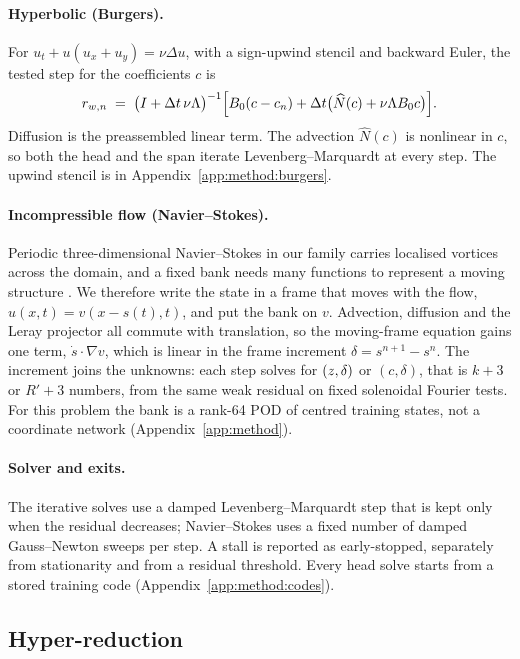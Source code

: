 \documentclass{article}
\begin{document}
\paragraph{Hyperbolic (Burgers).}
For $u_t+u(u_x+u_y)=\nu\Delta u$, with a sign-upwind stencil and backward
Euler, the tested step for the coefficients $c$ is
\begin{equation}
  r_{w,n}
  \;=\;
  \big(I+\Delta t\,\nu\Lambda\big)^{-1}
  \Big[
    B_0(c-c_n)
    +\Delta t\big(\widehat N(c)+\nu\Lambda B_0 c\big)
  \Big].
  \label{eq:burgers-step}
\end{equation}
Diffusion is the preassembled linear term. The advection $\widehat N(c)$ is
nonlinear in $c$, so both the head and the span iterate
Levenberg--Marquardt at every step. The upwind stencil is in
Appendix~\ref{app:method:burgers}.

\paragraph{Incompressible flow (Navier--Stokes).}
Periodic three-dimensional Navier--Stokes in our family carries localised
vortices across the domain, and a fixed bank needs many functions to
represent a moving structure \citep{CohenDeVore2015}. We therefore write
the state in a frame that moves with the flow,
$u(x,t)=v(x-s(t),t)$, and put the bank on $v$. Advection, diffusion and
the Leray projector all commute with translation, so the moving-frame
equation gains one term, $\dot s\cdot\nabla v$, which is linear in the
frame increment $\delta=s^{n+1}-s^{n}$. The increment joins the unknowns:
each step solves for $(z,\delta)$ or $(c,\delta)$, that is $k+3$ or
$R'+3$ numbers, from the same weak residual on fixed solenoidal Fourier
tests. For this problem the bank is a rank-64 POD of centred training
states, not a coordinate network (Appendix~\ref{app:method}).

\paragraph{Solver and exits.}
The iterative solves use a damped Levenberg--Marquardt step
\citep{Marquardt1963} that is kept only when the residual decreases;
Navier--Stokes uses a fixed number of damped Gauss--Newton sweeps per
step. A stall is reported as early-stopped, separately from stationarity
and from a residual threshold. Every head solve starts from a stored
training code (Appendix~\ref{app:method:codes}).

\subsection{Hyper-reduction}
\label{sec:method:precomp}
\end{document}
